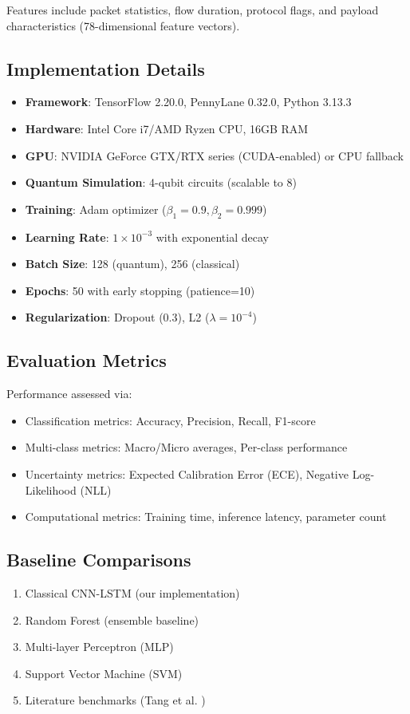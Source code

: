 \documentclass[conference]{IEEEtran}
\begin{document}
Features include packet statistics, flow duration, protocol flags, and payload characteristics (78-dimensional feature vectors).

\subsection{Implementation Details}
\begin{itemize}
    \item \textbf{Framework}: TensorFlow 2.20.0, PennyLane 0.32.0, Python 3.13.3
    \item \textbf{Hardware}: Intel Core i7/AMD Ryzen CPU, 16GB RAM
    \item \textbf{GPU}: NVIDIA GeForce GTX/RTX series (CUDA-enabled) or CPU fallback
    \item \textbf{Quantum Simulation}: 4-qubit circuits (scalable to 8)
    \item \textbf{Training}: Adam optimizer ($\beta_1=0.9, \beta_2=0.999$)
    \item \textbf{Learning Rate}: $1 \times 10^{-3}$ with exponential decay
    \item \textbf{Batch Size}: 128 (quantum), 256 (classical)
    \item \textbf{Epochs}: 50 with early stopping (patience=10)
    \item \textbf{Regularization}: Dropout (0.3), L2 ($\lambda=10^{-4}$)
\end{itemize}

\subsection{Evaluation Metrics}
Performance assessed via:
\begin{itemize}
    \item Classification metrics: Accuracy, Precision, Recall, F1-score
    \item Multi-class metrics: Macro/Micro averages, Per-class performance
    \item Uncertainty metrics: Expected Calibration Error (ECE), Negative Log-Likelihood (NLL)
    \item Computational metrics: Training time, inference latency, parameter count
\end{itemize}

\subsection{Baseline Comparisons}
\begin{enumerate}
    \item Classical CNN-LSTM (our implementation)
    \item Random Forest (ensemble baseline)
    \item Multi-layer Perceptron (MLP)
    \item Support Vector Machine (SVM)
    \item Literature benchmarks (Tang et al. \cite{ref5})
\end{enumerate}
\end{document}
